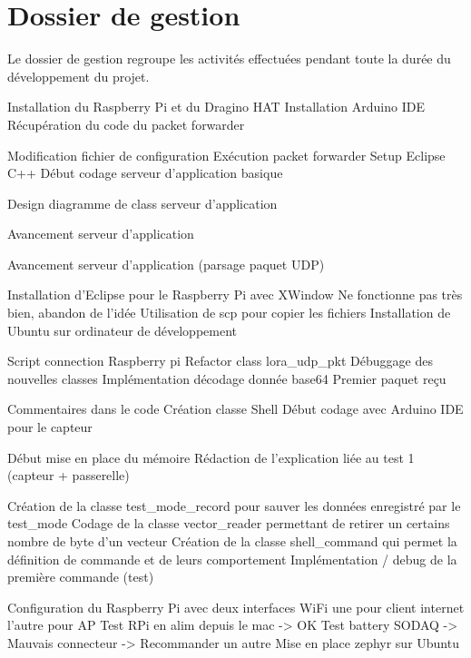 \chapter{Dossier de gestion}

Le dossier de gestion regroupe les activités effectuées pendant toute la durée du développement du projet.

\begin{multicols}{2}

Installation du Raspberry Pi et du Dragino HAT
Installation Arduino IDE
Récupération du code du packet forwarder

Modification fichier de configuration
Exécution packet forwarder
Setup Eclipse C++
Début codage serveur d'application basique

Design diagramme de class serveur d'application

Avancement serveur d'application

Avancement serveur d'application (parsage paquet UDP)

Installation d'Eclipse pour le Raspberry Pi avec XWindow
Ne fonctionne pas très bien, abandon de l'idée
Utilisation de scp pour copier les fichiers
Installation de Ubuntu sur ordinateur de développement

Script connection Raspberry pi
Refactor class lora\_udp\_pkt
Débuggage des nouvelles classes
Implémentation décodage donnée base64
Premier paquet reçu

Commentaires dans le code
Création classe Shell
Début codage avec Arduino IDE pour le capteur

Début mise en place du mémoire
Rédaction de l’explication liée au test 1 (capteur + passerelle)

Création de la classe test\_mode\_record pour sauver les données enregistré par le test\_mode
Codage de la classe vector\_reader permettant de retirer un certains nombre de byte d’un vecteur
Création de la classe shell\_command qui permet la définition de commande et de leurs comportement
Implémentation / debug de la première commande (test)

Configuration du Raspberry Pi avec deux interfaces WiFi une pour client internet l’autre pour AP
Test RPi en alim depuis le mac -> OK
Test battery SODAQ -> Mauvais connecteur -> Recommander un autre
Mise en place zephyr sur Ubuntu


\end{multicols}
